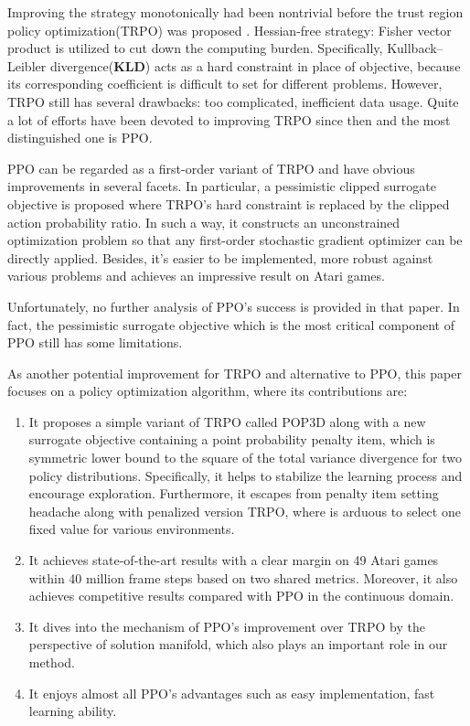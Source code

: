 \documentclass{article}
\begin{document}
Improving the strategy monotonically had been nontrivial before the trust region policy optimization(TRPO) was proposed \cite{2015arXiv150205477S}. Hessian-free strategy: Fisher vector product is utilized to cut down the computing burden. Specifically, Kullback–Leibler divergence(\textbf{KLD})  acts as a hard constraint in place of objective, because its corresponding coefficient is difficult to set for different problems.  However, TRPO still has several drawbacks: too complicated, inefficient data usage. Quite a lot of  efforts have been devoted to improving TRPO since then and the most distinguished one is PPO.

PPO can be regarded as a  first-order variant of TRPO and  have obvious improvements in several facets. In particular, a pessimistic clipped surrogate objective is proposed where TRPO's hard constraint is replaced  by the clipped action probability ratio. In such a way, it constructs an unconstrained optimization problem so that any first-order stochastic gradient optimizer can be  directly applied. Besides, it's easier to be  implemented, more robust against various problems and  achieves an impressive result on Atari games\cite{brockman2016openai}.

Unfortunately, no further analysis of PPO's success is provided in that paper. In fact, the pessimistic surrogate objective which is the most critical component of PPO still has some limitations. 

As another potential improvement for TRPO and alternative to PPO, this paper focuses on a policy optimization algorithm, where its contributions are:
\begin{enumerate}
	\item It proposes a simple variant of TRPO called POP3D
	along with a new surrogate objective containing a point
	probability penalty item, which is symmetric lower
	bound to the square of the total variance divergence for
	two policy distributions. Specifically, it helps to stabilize the learning process and encourage exploration. Furthermore, it escapes from penalty item setting headache
	along with penalized version TRPO, where is arduous to
	select one fixed value for various environments.
	\item It achieves state-of-the-art results with a clear margin on
	49 Atari games within 40 million frame steps based on
	two shared metrics. Moreover, it also achieves competitive results compared with PPO in the continuous domain.
	\item It dives into the mechanism of PPO's improvement over TRPO by the perspective of solution manifold, which also plays an important role in our method.
	\item It enjoys almost all PPO's advantages such as easy implementation, fast learning ability.
\end{enumerate}
\end{document}
